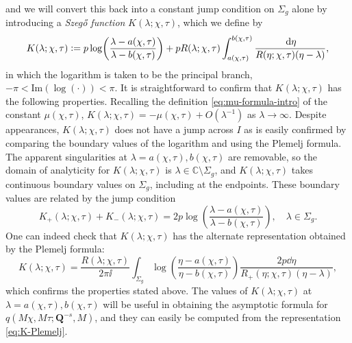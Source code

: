 and we will convert this back into a constant jump condition on $\Sigma_g$ alone by introducing a \emph{Szeg{\H o} function} $K(\lambda;\chi,\tau)$, which we define by
\begin{equation}
K(\lambda;\chi,\tau)\defeq  p\log\left(\frac{\lambda-a(\chi,\tau)}{\lambda-b(\chi,\tau)}\right)+ p R(\lambda;\chi,\tau) \int_{a(\chi,\tau)}^{b(\chi,\tau)}\frac{\dd \eta}{R(\eta;\chi,\tau)(\eta-\lambda)}, %
\label{eq:K-def}
\end{equation}
in which the logarithm is taken to be the principal branch, $-\pi<\mathrm{Im}(\log(\cdot))<\pi$. 
It is straightforward to confirm that $K(\lambda;\chi,\tau)$ has the following properties.
Recalling the definition \eqref{eq:mu-formula-intro} of the constant $\mu(\chi,\tau)$, $K(\lambda;\chi,\tau) = -\mu(\chi,\tau) + O(\lambda^{-1})$ as $\lambda\to\infty$. Despite appearances, $K(\lambda;\chi,\tau)$ does not have a jump across $I$ as is easily confirmed by comparing the boundary values of the logarithm and using the Plemelj formula.  
The apparent singularities at $\lambda=a(\chi,\tau),b(\chi,\tau)$ are removable, so the domain of analyticity for $K(\lambda;\chi,\tau)$ is $\lambda\in\mathbb{C}\setminus\Sigma_g$, and $K(\lambda;\chi,\tau)$ takes continuous boundary values on $\Sigma_g$, including at the endpoints.  These boundary values are related by the jump condition
\begin{equation}
K_+(\lambda;\chi,\tau)+K_-(\lambda;\chi,\tau)=2 p\log\left(\frac{\lambda-a(\chi,\tau)}{\lambda-b(\chi,\tau)}\right),\quad \lambda\in\Sigma_g.
\label{eq:K-jump}
\end{equation}
One can indeed check that $K(\lambda;\chi,\tau)$ has the alternate representation obtained by the Plemelj formula:
\begin{equation}
K(\lambda;\chi,\tau) =  \frac{R(\lambda;\chi,\tau)}{2\pi \ii} \int_{\Sigma_g} \log\left( \frac{\eta - a(\chi,\tau)}{\eta - b(\chi,\tau)}\right) \frac{2 p  \dd \eta}{R_+(\eta; \chi,\tau)(\eta - \lambda)},
\label{eq:K-Plemelj}
\end{equation}
which confirms the properties stated above. The values of $K(\lambda;\chi,\tau)$ at $\lambda=a(\chi,\tau),b(\chi,\tau)$ will be useful in obtaining the asymptotic formula for $q( M \chi, M\tau;\mathbf{Q}^{-s},M)$, and they can easily be computed from the representation \eqref{eq:K-Plemelj}. 
